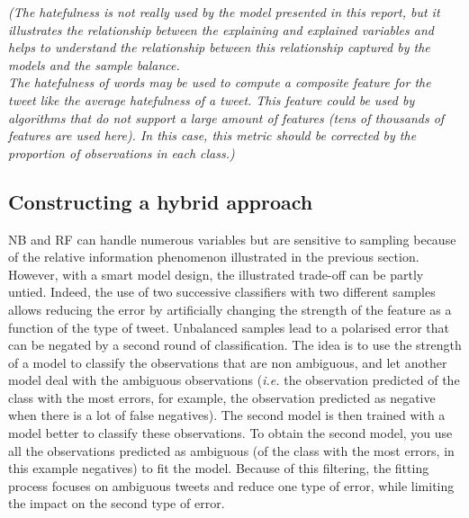 \documentclass[a4paper, justified]{tufte-handout}
\begin{document}
\begin{fullwidth}
\textit{(The hatefulness is not really used by the model presented in this report, but it illustrates the relationship between the explaining and explained variables and helps to understand the relationship between this relationship captured by the models and the sample balance.\\
The hatefulness of words may be used to compute a composite feature for the tweet like the average hatefulness of a tweet. This feature could be used by algorithms that do not support a large amount of features (tens of thousands of features are used here). In this case, this metric should be corrected by the proportion of observations in each class.)}

\subsection{Constructing a hybrid approach}

NB and RF can handle numerous variables but are sensitive to sampling because of the relative information phenomenon illustrated in the previous section. However, with a smart model design, the illustrated trade-off can be partly untied. Indeed, the use of two successive classifiers with two different samples allows reducing the error by artificially changing the strength of the feature as a function of the type of tweet. Unbalanced samples lead to a polarised error that can be negated by a second round of classification. The idea is to use the strength of a model to classify the observations that are non ambiguous, and let another model deal with the ambiguous observations (\textit{i.e.} the observation predicted of the class with the most errors, for example, the observation predicted as negative when there is a lot of false negatives). The second model is then trained with a model better to classify these observations. To obtain the second model, you use all the observations predicted as ambiguous (of the class with the most errors, in this example negatives) to fit the model. Because of this filtering, the fitting process focuses on ambiguous tweets and reduce one type of error, while limiting the impact on the second type of error.


\end{fullwidth}
\end{document}
